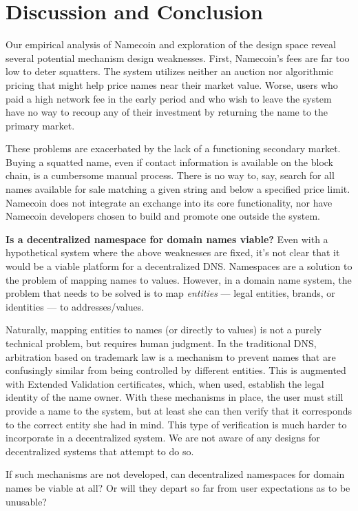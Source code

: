 \section{Discussion and Conclusion}
\label{sec:conclusion}

Our empirical analysis of Namecoin and exploration of the design space reveal several potential mechanism design weaknesses. First, Namecoin's fees are far too low to deter squatters. The system utilizes neither an auction nor algorithmic pricing that might help price names near their market value. Worse, users who paid a high network fee in the early period and who wish to leave the system have no way to recoup any of their investment by returning the name to the primary market.

These problems are exacerbated by the lack of a functioning secondary market. Buying a squatted name, even if contact information is available on the block chain, is a cumbersome manual process. There is no way to, say, search for all names available for sale matching a given string and below a specified price limit. Namecoin does not integrate an exchange into its core functionality, nor have Namecoin developers chosen to build and promote one outside the system.

{\bf Is a decentralized namespace for domain names viable?} Even with a hypothetical system where the above weaknesses are fixed, it's not clear that it would be a viable platform for a decentralized DNS. Namespaces are a solution to the problem of mapping names to values. However, in a domain name system, the problem that needs to be solved is to map {\em entities} --- legal entities, brands, or identities --- to addresses/values.

Naturally, mapping entities to names (or directly to values) is not a purely technical problem, but requires human judgment.
In the traditional DNS, arbitration based on trademark law is a mechanism to prevent names that are confusingly similar from being controlled by different entities. This is augmented with Extended Validation certificates, which, when used, establish the legal identity of the name owner. With these mechanisms in place, the user must still provide a name to the system, but at least she can then verify that it corresponds to the correct entity she had in mind. This type of verification is much harder to incorporate in a decentralized system. We are not aware of any designs for decentralized systems that attempt to do so.

If such mechanisms are not developed, can decentralized namespaces for domain names be viable at all? Or will they depart so far from user expectations as to be unusable?

